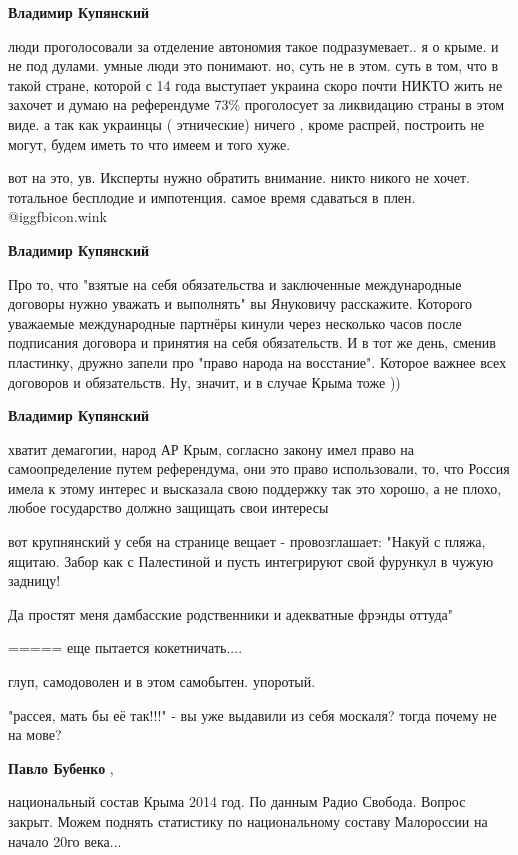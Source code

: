 \begin{itemize}
\begin{itemize}
\textbf{Владимир Купянский} 

люди проголосовали за отделение автономия такое подразумевает.. я о крыме. и не
под дулами. умные люди это понимают. но, суть не в этом. суть в том, что в
такой стране, которой с 14 года выступает украина скоро почти НИКТО жить не
захочет и думаю на референдуме 73\% проголосует за ликвидацию страны в этом
виде. а так как украинцы ( этнические) ничего , кроме распрей, построить не
могут, будем иметь то что имеем и того хуже.

вот на это, ув. Иксперты нужно обратить внимание.
никто никого не хочет. тотальное бесплодие и импотенция.
самое время сдаваться в плен. @igg{fbicon.wink} 


\textbf{Владимир Купянский} 

Про то, что "взятые на себя обязательства и заключенные международные договоры
нужно уважать и выполнять" вы Януковичу расскажите. Которого уважаемые
международные партнёры кинули через несколько часов после подписания договора и
принятия на себя обязательств. И в тот же день, сменив пластинку, дружно запели
про "право народа на восстание". Которое важнее всех договоров и обязательств.
Ну, значит, и в случае Крыма тоже ))

\textbf{Владимир Купянский} 

хватит демагогии, народ АР Крым, согласно закону имел право на самоопределение
путем референдума, они это право использовали, то, что Россия имела к этому
интерес и высказала свою поддержку так это хорошо, а не плохо, любое
государство должно защищать свои интересы



вот крупнянский у себя на странице вещает - провозглашает: "Накуй с пляжа,
ящитаю. Забор как с Палестиной и пусть интегрируют свой фурункул в чужую
задницу!

Да простят меня дамбасские родственники и адекватные фрэнды оттуда"

===== еще пытается кокетничать....

глуп, самодоволен и в этом самобытен. упоротый.

"рассея, мать бы её так!!!" - вы уже выдавили из себя москаля? тогда почему не на мове?

\textbf{Павло Бубенко} , 

национальный состав Крыма 2014 год. По данным Радио Свобода. Вопрос закрыт.
Можем поднять статистику по национальному составу Малороссии на начало 20го
века...


\end{itemize}
\end{itemize}
